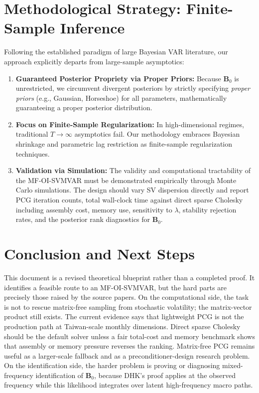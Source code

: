 \documentclass[12pt]{article}
\begin{document}
\section{Methodological Strategy: Finite-Sample Inference}
Following the established paradigm of large Bayesian VAR literature, our approach explicitly departs from large-sample asymptotics:
\begin{enumerate}
    \item \textbf{Guaranteed Posterior Propriety via Proper Priors:} Because $\mathbf{B}_0$ is unrestricted, we circumvent divergent posteriors by strictly specifying \textit{proper priors} (e.g., Gaussian, Horseshoe) for all parameters, mathematically guaranteeing a proper posterior distribution.
    \item \textbf{Focus on Finite-Sample Regularization:} In high-dimensional regimes, traditional $T \to \infty$ asymptotics fail. Our methodology embraces Bayesian shrinkage and parametric lag restriction as finite-sample regularization techniques.
    \item \textbf{Validation via Simulation:} The validity and computational tractability of the MF-OI-SVMVAR must be demonstrated empirically through Monte Carlo simulations. The design should vary SV dispersion directly and report PCG iteration counts, total wall-clock time against direct sparse Cholesky including assembly cost, memory use, sensitivity to $\lambda$, stability rejection rates, and the posterior rank diagnostics for $\mathbf{B}_0$.
\end{enumerate}

\section{Conclusion and Next Steps}
This document is a revised theoretical blueprint rather than a completed proof. It identifies a feasible route to an MF-OI-SVMVAR, but the hard parts are precisely those raised by the source papers. On the computational side, the task is not to rescue matrix-free sampling from stochastic volatility; the matrix-vector product still exists. The current evidence says that lightweight PCG is not the production path at Taiwan-scale monthly dimensions. Direct sparse Cholesky should be the default solver unless a fair total-cost and memory benchmark shows that assembly or memory pressure reverses the ranking. Matrix-free PCG remains useful as a larger-scale fallback and as a preconditioner-design research problem. On the identification side, the harder problem is proving or diagnosing mixed-frequency identification of $\mathbf{B}_0$, because DHK's proof applies at the observed frequency while this likelihood integrates over latent high-frequency macro paths.



\end{document}
